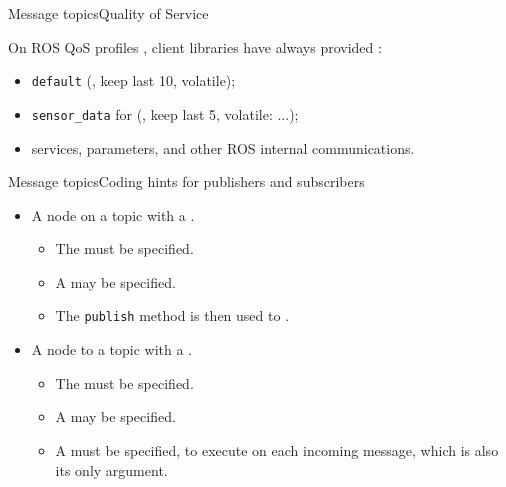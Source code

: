 \begin{frame}{Message topics}{Quality of Service}
  \justifying
  \begin{alertblock}{On ROS QoS profiles}
    \justifying
    , client libraries have always provided :
    \begin{itemize}
      \item \texttt{default} (, keep last 10, volatile);
      \item \texttt{sensor\_data} for  (, keep last 5, volatile: ...);
      \item services, parameters, and other ROS internal communications.
    \end{itemize}
  \end{alertblock}
\end{frame}
\begin{frame}{Message topics}{Coding hints for publishers and subscribers}
  \justifying
  \begin{itemize}
    \item A node  on a topic with a .
      \begin{itemize}
        \item The  must be specified.
        \item A  may be specified.
        \item The \texttt{publish} method is then used to .
      \end{itemize}
    \item A node  to a topic with a .
      \begin{itemize}
        \item The  must be specified.
        \item A  may be specified.
        \item A  must be specified, to execute on each incoming message, which is also its only argument.
      \end{itemize}
  \end{itemize}
\end{frame}
